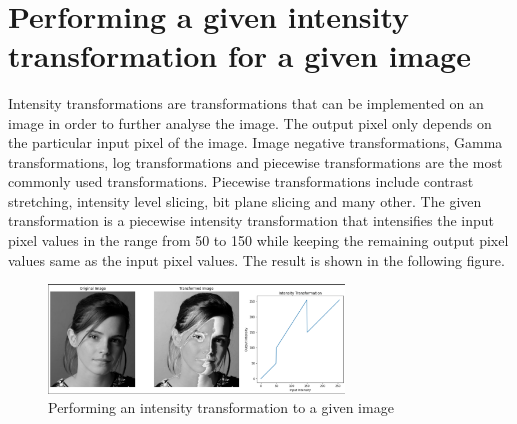 \documentclass[11pt]{article}
\begin{document}
\newpage
{}
\begin{flushleft}
\vspace*{-1cm}
\hspace*{-3.6cm}
\\
[0.4cm]
\hspace*{-3cm}
\section{Performing a given intensity transformation for a given image}
Intensity transformations are transformations that can be implemented on an image in order to further analyse the image. The output pixel only depends on the particular input pixel of the image.
Image negative transformations, Gamma transformations, log transformations and piecewise transformations are the most commonly used transformations. Piecewise transformations include contrast stretching, intensity level slicing, bit plane slicing and many other. 
\newline
The given transformation is a piecewise intensity transformation that intensifies the input pixel values in the range from 50 to 150 while keeping the remaining output pixel values same as the input pixel values. The result is shown in the following figure.
\hspace{-3cm}
\begin{figure}[htp]
    \centering
    \includegraphics[width=0.7\textwidth]{Intensity transformation.png}
    \caption{Performing an intensity transformation to a given image}
\end{figure}

\end{flushleft}
\end{document}
